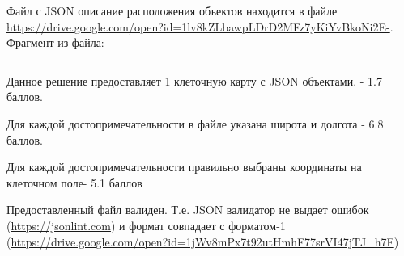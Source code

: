 \solutionSection

Файл с JSON описание расположения объектов находится в файле \url{https://drive.google.com/open?id=1lv8kZLbawpLDrD2MFz7yKiYvBkoNi2E-}. 
Фрагмент из файла: 

\inputminted[fontsize=\footnotesize, linenos]{json}{final/command_tour/ar/task_02/source.json}

\markSection

Данное решение предоставляет 1 клеточную карту с JSON объектами. - 1.7 баллов.

Для каждой достопримечательности в файле указана широта и долгота - 6.8 баллов.

Для каждой достопримечательности правильно выбраны координаты на клеточном поле- 5.1 баллов

Предоставленный файл валиден. Т.е. JSON валидатор не выдает ошибок (\url{https://jsonlint.com}) и формат совпадает с форматом-1 (\url{https://drive.google.com/open?id=1jWv8mPx7t92utHmhF77srVI47jTJ_h7F})